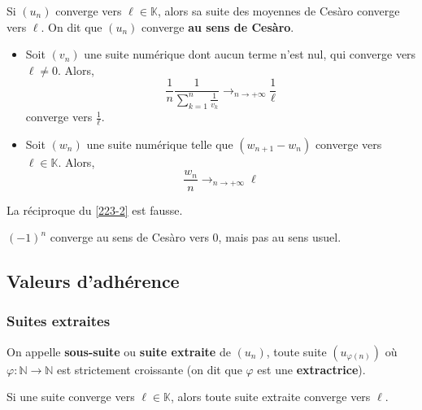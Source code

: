 	\begin{theorem}
		\label{223-2}
		Si $(u_n)$ converge vers $\ell \in \mathbb{K}$, alors sa suite des moyennes de Cesàro converge vers $\ell$. On dit que $(u_n)$ converge \textbf{au sens de Cesàro}.
	\end{theorem}

	\begin{example}
		\begin{itemize}
			\item Soit $(v_n)$ une suite numérique dont aucun terme n'est nul, qui converge vers $\ell \neq 0$. Alors,
			\[ \frac{1}{n} \frac{1}{\sum_{k=1}^n \frac{1}{v_k}} \longrightarrow_{n \rightarrow +\infty} \frac{1}{\ell} \]
			converge vers $\frac{1}{\ell}$.
			\item Soit $(w_n)$ une suite numérique telle que $(w_{n+1} - w_n)$ converge vers $\ell \in \mathbb{K}$. Alors,
			\[ \frac{w_n}{n} \longrightarrow_{n \rightarrow +\infty} \ell \]
		\end{itemize}
	\end{example}

	\begin{remark}
		La réciproque du \cref{223-2} est fausse.
	\end{remark}

	\begin{example}
		$(-1)^n$ converge au sens de Cesàro vers $0$, mais pas au sens usuel.
	\end{example}

	\subsection{Valeurs d'adhérence}

	\subsubsection{Suites extraites}


	\begin{definition}
		On appelle \textbf{sous-suite} ou \textbf{suite extraite} de $(u_n)$, toute suite $(u_{\varphi(n)})$ où $\varphi : \mathbb{N} \rightarrow \mathbb{N}$ est strictement croissante (on dit que $\varphi$ est une \textbf{extractrice}).
	\end{definition}

	\begin{proposition}
		Si une suite converge vers $\ell \in \mathbb{K}$, alors toute suite extraite converge vers $\ell$.
	\end{proposition}

